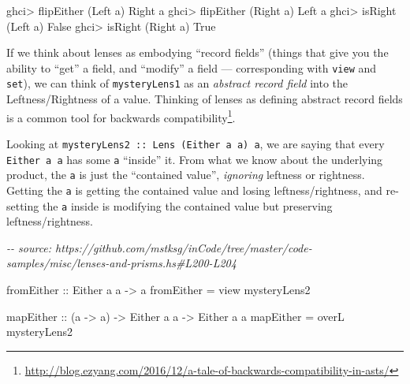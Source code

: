 \documentclass[]{article}
\newenvironment{Shaded}{}{}
\newcommand{\CharTok}[1]{\textcolor[rgb]{0.25,0.44,0.63}{#1}}
\newcommand{\CommentTok}[1]{\textcolor[rgb]{0.38,0.63,0.69}{\textit{#1}}}
\newcommand{\DataTypeTok}[1]{\textcolor[rgb]{0.56,0.13,0.00}{#1}}
\newcommand{\NormalTok}[1]{#1}
\newcommand{\OperatorTok}[1]{\textcolor[rgb]{0.40,0.40,0.40}{#1}}
\newcommand{\OtherTok}[1]{\textcolor[rgb]{0.00,0.44,0.13}{#1}}
\renewcommand{\href}[2]{#2\footnote{\url{#1}}}
\begin{document}
\begin{Shaded}
\begin{Highlighting}[]
\NormalTok{ghci}\OperatorTok{\textgreater{}}\NormalTok{ flipEither (}\DataTypeTok{Left} \CharTok{\textquotesingle{}a\textquotesingle{}}\NormalTok{)}
\DataTypeTok{Right} \CharTok{\textquotesingle{}a\textquotesingle{}}
\NormalTok{ghci}\OperatorTok{\textgreater{}}\NormalTok{ flipEither (}\DataTypeTok{Right} \CharTok{\textquotesingle{}a\textquotesingle{}}\NormalTok{)}
\DataTypeTok{Left} \CharTok{\textquotesingle{}a\textquotesingle{}}
\NormalTok{ghci}\OperatorTok{\textgreater{}}\NormalTok{ isRight (}\DataTypeTok{Left} \CharTok{\textquotesingle{}a\textquotesingle{}}\NormalTok{)}
\DataTypeTok{False}
\NormalTok{ghci}\OperatorTok{\textgreater{}}\NormalTok{ isRight (}\DataTypeTok{Right} \CharTok{\textquotesingle{}a\textquotesingle{}}\NormalTok{)}
\DataTypeTok{True}
\end{Highlighting}
\end{Shaded}

If we think about lenses as embodying ``record fields'' (things that give you
the ability to ``get'' a field, and ``modify'' a field --- corresponding with
\texttt{view} and \texttt{set}), we can think of \texttt{mysteryLens1} as an
\emph{abstract record field} into the Leftness/Rightness of a value. Thinking of
lenses as defining abstract record fields is a
\href{http://blog.ezyang.com/2016/12/a-tale-of-backwards-compatibility-in-asts/}{common
tool for backwards compatibility}.

Looking at \texttt{mysteryLens2\ ::\ Lens\textquotesingle{}\ (Either\ a\ a)\ a},
we are saying that every \texttt{Either\ a\ a} has some \texttt{a} ``inside''
it. From what we know about the underlying product, the \texttt{a} is just the
``contained value'', \emph{ignoring} leftness or rightness. Getting the
\texttt{a} is getting the contained value and losing leftness/rightness, and
re-setting the \texttt{a} inside is modifying the contained value but preserving
leftness/rightness.

\begin{Shaded}
\begin{Highlighting}[]
\CommentTok{{-}{-} source: https://github.com/mstksg/inCode/tree/master/code{-}samples/misc/lenses{-}and{-}prisms.hs\#L200{-}L204}

\OtherTok{fromEither ::} \DataTypeTok{Either}\NormalTok{ a a }\OtherTok{{-}\textgreater{}}\NormalTok{ a}
\NormalTok{fromEither }\OtherTok{=}\NormalTok{ view mysteryLens2}

\OtherTok{mapEither ::}\NormalTok{ (a }\OtherTok{{-}\textgreater{}}\NormalTok{ a) }\OtherTok{{-}\textgreater{}} \DataTypeTok{Either}\NormalTok{ a a }\OtherTok{{-}\textgreater{}} \DataTypeTok{Either}\NormalTok{ a a}
\NormalTok{mapEither }\OtherTok{=}\NormalTok{ overL mysteryLens2}
\end{Highlighting}
\end{Shaded}
\end{document}
